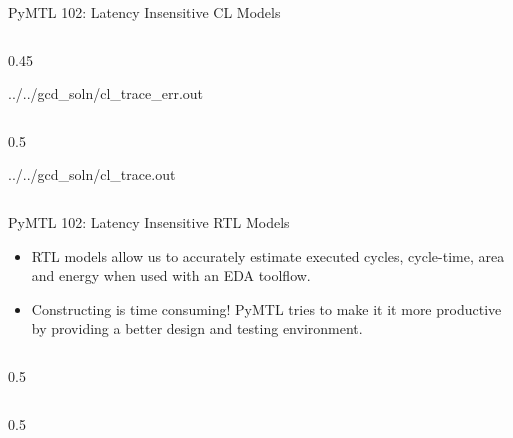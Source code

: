 \begin{frame}{PyMTL 102: Latency Insensitive CL Models}
\vspace{-0.25in}

  \begin{cbxcols}
  \begin{column}{0.45\tw}

%
{../../gcd_soln/cl_trace_err.out}

  \end{column}
  \begin{column}{0.5\tw}

%
{../../gcd_soln/cl_trace.out}

  \end{column}
  \end{cbxcols}

\end{frame}

\begin{frame}{PyMTL 102: Latency Insensitive RTL Models}

\begin{itemize}
  \item RTL models allow us to accurately estimate executed cycles,
        cycle-time, area and energy when used with an EDA toolflow.
  \smallskip
  \item Constructing is time consuming! PyMTL tries to make it it more
        productive by providing a better design and testing environment.
\end{itemize}

  \vspace{0.1in}
  \begin{cbxcols}
  \begin{column}{0.5\tw}
  \end{column}
  \begin{column}{0.5\tw}
  \end{column}
  \end{cbxcols}
\end{frame}

